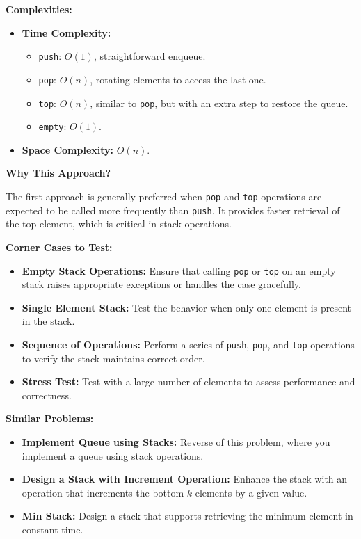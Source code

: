 \textbf{Complexities:}

\begin{itemize}
    \item \textbf{Time Complexity:}
        \begin{itemize}
            \item \texttt{push}: \(O(1)\), straightforward enqueue.
            \item \texttt{pop}: \(O(n)\), rotating elements to access the last one.
            \item \texttt{top}: \(O(n)\), similar to \texttt{pop}, but with an extra step to restore the queue.
            \item \texttt{empty}: \(O(1)\).
        \end{itemize}
    \item \textbf{Space Complexity:} \(O(n)\).
\end{itemize}

\textbf{Why This Approach?}

The first approach is generally preferred when \texttt{pop} and \texttt{top} operations are expected to be called more frequently than \texttt{push}. It provides faster retrieval of the top element, which is critical in stack operations.

\textbf{Corner Cases to Test:}

\begin{itemize}
    \item \textbf{Empty Stack Operations:} Ensure that calling \texttt{pop} or \texttt{top} on an empty stack raises appropriate exceptions or handles the case gracefully.
    \item \textbf{Single Element Stack:} Test the behavior when only one element is present in the stack.
    \item \textbf{Sequence of Operations:} Perform a series of \texttt{push}, \texttt{pop}, and \texttt{top} operations to verify the stack maintains correct order.
    \item \textbf{Stress Test:} Test with a large number of elements to assess performance and correctness.
\end{itemize}

\textbf{Similar Problems:}

\begin{itemize}
    \item \textbf{Implement Queue using Stacks:} Reverse of this problem, where you implement a queue using stack operations.
    \item \textbf{Design a Stack with Increment Operation:} Enhance the stack with an operation that increments the bottom \(k\) elements by a given value.
    \item \textbf{Min Stack:} Design a stack that supports retrieving the minimum element in constant time.
\end{itemize}

